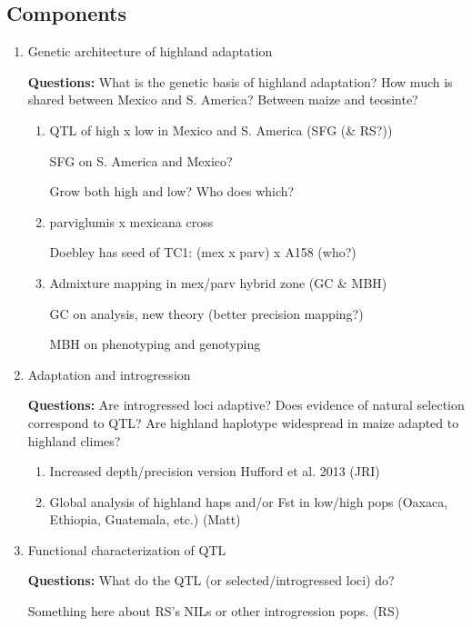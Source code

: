\documentclass[]{article}
\begin{document}
\subsection*{Components}
\begin{enumerate}
	\item Genetic architecture of highland adaptation
	
	{\bf Questions:} What is the genetic basis of highland adaptation?  How much is shared between Mexico and S. America? Between maize and teosinte? 
	\begin{enumerate}
		\item QTL of high x low in Mexico and S. America (SFG (\& RS?))
		
		SFG on S. America and Mexico? 
		
		Grow both high and low? Who does which?

		\item parviglumis x mexicana cross
		
		Doebley has seed of TC1: (mex x parv) x A158 (who?) 
		\item Admixture mapping in mex/parv hybrid zone (GC \& MBH)

		GC on analysis, new theory (better precision mapping?)
		
		MBH on phenotyping and genotyping
	\end{enumerate}
	\item Adaptation and introgression
	
	{\bf Questions:} Are introgressed loci adaptive? Does evidence of natural selection correspond to QTL? Are highland haplotype widespread in maize adapted to highland climes?
	\begin{enumerate}	
		\item Increased depth/precision version Hufford et al. 2013 (JRI)

		\item Global analysis of highland haps and/or Fst in low/high pops (Oaxaca, Ethiopia, Guatemala, etc.) (Matt)
	\end{enumerate}
	\item Functional characterization of QTL
	
	{\bf Questions:} What do the QTL (or selected/introgressed loci) do?
	
	Something here about RS's NILs or other introgression pops. (RS)

\end{enumerate}
\end{document}
